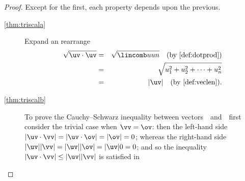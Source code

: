\begin{proof} 
Except for the first, each property depends upon the previous.
\begin{description}
\item[\ref{thm:triscala}]
Expand an rearrange
\begin{eqnarray*}
\sqrt{\uv\cdot\uv}&=&\sqrt{\lincomb uun}\quad(\text{by \cref{def:dotprod}})
\\&=&\sqrt{u_1^2+u_2^2+\cdots+u_n^2}
\\&=&|\uv|\quad(\text{by \cref{def:veclen}}).
\end{eqnarray*}

\item[\ref{thm:triscalb}]  
To prove the Cauchy--Schwarz inequality between vectors~\uv\ and~\vv\ first consider the trivial case when \(\vv=\ov\): then the left-hand side \(|\uv\cdot\vv|=|\uv\cdot\ov|=|\ov|=0\); whereas the right-hand side \(|\uv||\vv|=|\uv||\ov|=|\uv|0=0\); and so the inequality \(|\uv\cdot\vv|\leq|\uv||\vv|\) is satisfied in 


\end{description}
\end{proof}
